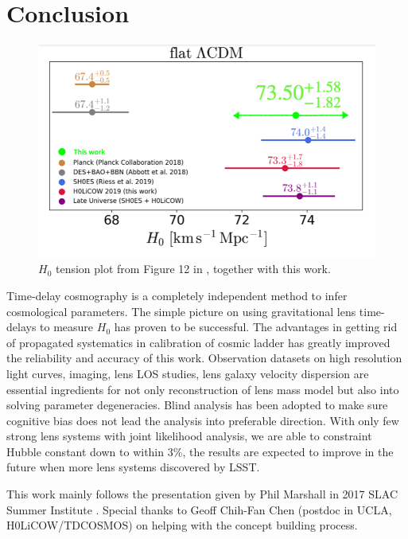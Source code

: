 \documentclass{cosmo}
\begin{document}
\section{Conclusion}
\begin{figure}[h]
        \centering
        \includegraphics[width=1\textwidth]{fig20_2.png}
        \caption{$H_\mathrm{0}$ tension plot from Figure 12 in \cite{Wong2019}, together with this work.}
        \label{fig14}
\end{figure}
Time-delay cosmography is a completely independent method to infer cosmological parameters. The simple picture on using gravitational lens time-delays to measure $H_\mathrm{0}$ has proven to be successful. The advantages in getting rid of propagated systematics in calibration of cosmic ladder has greatly improved the reliability and accuracy of this work. Observation datasets on high resolution light curves, imaging, lens LOS studies, lens galaxy velocity dispersion are essential ingredients for not only reconstruction of lens mass model but also into solving parameter degeneracies. Blind analysis has been adopted to make sure cognitive bias does not lead the analysis into preferable direction. With only few strong lens systems with joint likelihood analysis, we are able to constraint Hubble constant down to within $3 \%$, the results are expected to improve in the future when more lens systems discovered by LSST. 

\begin{acknowledgement}
This work mainly follows the presentation
given by Phil Marshall in 2017 SLAC Summer Institute \citep{Matshall2017}.
Special thanks to Geoff Chih-Fan Chen (postdoc in UCLA,
H0LiCOW/TDCOSMOS) on helping with the concept building process.
\end{acknowledgement}

%
%
\end{document}
